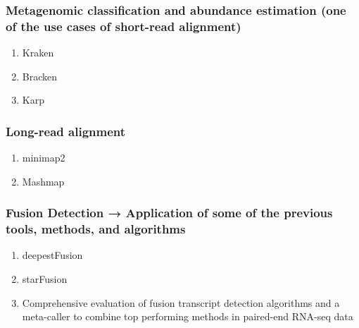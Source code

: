 \subsubsection{Metagenomic classification and abundance estimation (one of the use cases of short-read alignment)}
\begin{enumerate}
    \item Kraken
    \item Bracken
    \item Karp
\end{enumerate}
\subsubsection{Long-read alignment}
\begin{enumerate}
    \item minimap2
    \item Mashmap
\end{enumerate}
\subsubsection{Fusion Detection → Application of some of the previous tools, methods, and algorithms}
\begin{enumerate}
    \item deepestFusion
    \item starFusion
    \item Comprehensive evaluation of fusion transcript detection algorithms and a meta-caller to combine top performing methods in paired-end RNA-seq data
\end{enumerate}


